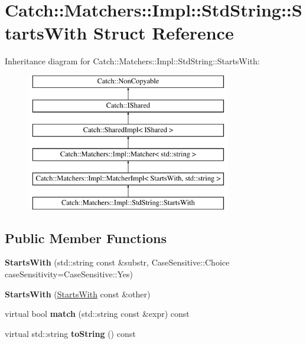 \hypertarget{structCatch_1_1Matchers_1_1Impl_1_1StdString_1_1StartsWith}{}\section{Catch\+:\+:Matchers\+:\+:Impl\+:\+:Std\+String\+:\+:Starts\+With Struct Reference}
\label{structCatch_1_1Matchers_1_1Impl_1_1StdString_1_1StartsWith}
Inheritance diagram for Catch\+:\+:Matchers\+:\+:Impl\+:\+:Std\+String\+:\+:Starts\+With\+:\begin{figure}[H]
\begin{center}
\leavevmode
\includegraphics[height=6.000000cm]{structCatch_1_1Matchers_1_1Impl_1_1StdString_1_1StartsWith}
\end{center}
\end{figure}
\subsection*{Public Member Functions}
\begin{DoxyCompactItemize}
\item 
\mbox{\label{structCatch_1_1Matchers_1_1Impl_1_1StdString_1_1StartsWith_a0db1bd8876219464ae60346c9525bcf6}} 
{\bfseries Starts\+With} (std\+::string const \&substr, Case\+Sensitive\+::\+Choice case\+Sensitivity=Case\+Sensitive\+::\+Yes)
\item 
\mbox{\label{structCatch_1_1Matchers_1_1Impl_1_1StdString_1_1StartsWith_a5526cb587632e7e46253d6f60ae01098}} 
{\bfseries Starts\+With} (\hyperlink{structCatch_1_1Matchers_1_1Impl_1_1StdString_1_1StartsWith}{Starts\+With} const \&other)
\item 
\mbox{\label{structCatch_1_1Matchers_1_1Impl_1_1StdString_1_1StartsWith_ab8f8d15e06d7ec13fee7d9ec4075dafa}} 
virtual bool {\bfseries match} (std\+::string const \&expr) const
\item 
\mbox{\label{structCatch_1_1Matchers_1_1Impl_1_1StdString_1_1StartsWith_a85a24e2ac23025edbe31cbf5bb755fb3}} 
virtual std\+::string {\bfseries to\+String} () const
\end{DoxyCompactItemize}

